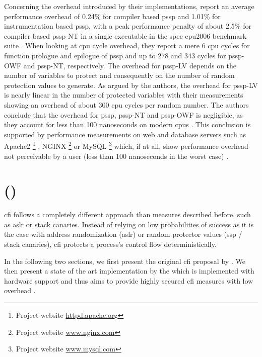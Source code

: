 Concerning the overhead introduced by their implementations, \citeauthor{Wang2018} report an average performance overhead of 0.24\% for compiler based \gls{pssp} and 1.01\% for instrumentation based \gls{pssp}, with a peak performance penalty of about 2.5\% for compiler based \acs{pssp}-NT in a single executable in the \gls{spec} \acs{cpu}2006 benchmark suite \cite[252]{Wang2018}.
When looking at \gls{cpu} cycle overhead, they report a mere 6 \gls{cpu} cycles for function prologue and epilogue of \gls{pssp} and up to 278 and 343 cycles for \acs{pssp}-OWF and \acs{pssp}-NT, respectively.
The overhead for \acs{pssp}-LV depends on the number of variables to protect and consequently on the number of random protection values to generate.
As argued by the authors, the overhead for \acs{pssp}-LV is nearly linear in the number of protected variables with their measurements showing an overhead of about 300 \acs{cpu} cycles per random number.
The authors conclude that the overhead for \gls{pssp}, \acs{pssp}-NT and \acs{pssp}-OWF is negligible, as they account for less than 100 nanoseconds on modern \glspl{cpu} \cite[252\psq]{Wang2018}.
This conclusion is supported by performance measurements on web and database servers such as Apache2%
	\footnote{Project website \href{https://httpd.apache.org}{httpd.apache.org}}%
, NGINX%
	\footnote{Project website \href{https://www.nginx.com}{www.nginx.com}}
or MySQL%
	\footnote{Project website \href{https://www.mysql.com}{www.mysql.com}}
which, if at all, show performance overhead not perceivable by a user (less than 100 nanoseconds in the worst case) \cite[252\psq]{Wang2018}.

\section{ ()}
\label{sec:control-flow-integrity}

\gls{cfi} follows a completely different approach than measures described before, such as \gls{aslr} or stack canaries.
Instead of relying on low probabilities of success as it is the case with address randomization (\gls{aslr}) or random protector values (\gls{ssp} / stack canaries), \gls{cfi} protects a process's control flow deterministically.

In the following two sections, we first present the original \gls{cfi} proposal by \citeauthor{Abadi2005} \cite{Abadi2005}.
We then present a state of the art implementation by the \citeauthor{IntelCorporation2019} which is implemented with hardware support and thus aims to provide highly secured \gls{cfi} measures with low overhead \cite{IntelCorporation2019}.

